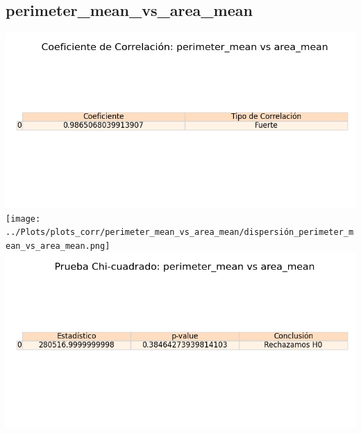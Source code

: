 \documentclass[a4paper, 12pt]{article}
\begin{document}
\subsection{perimeter\_mean\_vs\_area\_mean}
    \includegraphics[width = \textwidth]{../Plots/plots_corr/perimeter_mean_vs_area_mean/coeficiente_correlacion_perimeter_mean_vs_area_mean.png}
    \texttt{[image: ../Plots/plots\_corr/perimeter\_mean\_vs\_area\_mean/dispersión\_perimeter\_mean\_vs\_area\_mean.png]}
    \includegraphics[width = \textwidth]{../Plots/plots_corr/perimeter_mean_vs_area_mean/chi_cuadrado_perimeter_mean_vs_area_mean.png}
\end{document}
